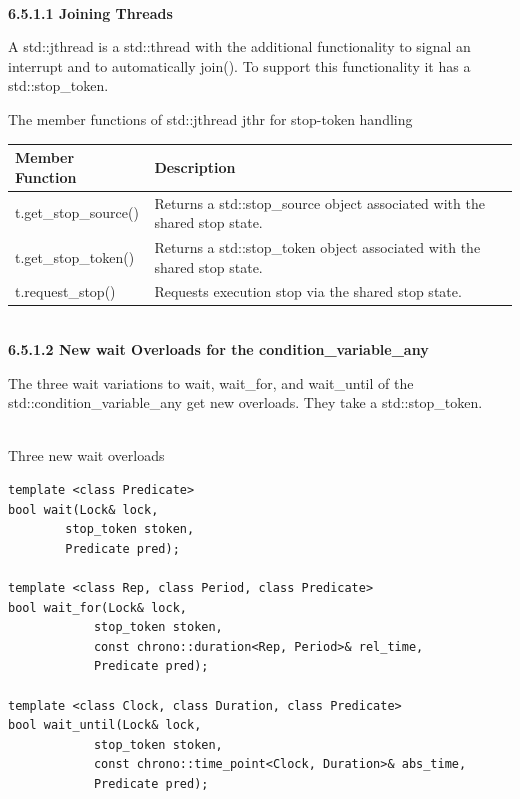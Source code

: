 \hspace*{\fill} \\ %
\noindent
\textbf{6.5.1.1\hspace{0.2cm} Joining Threads}

A std::jthread is a std::thread with the additional functionality to signal an interrupt and to automatically join(). To support this functionality it has a std::stop\_token.

\begin{center}
The member functions of std::jthread jthr for stop-token handling
\end{center}

\begin{table}[H]
\centering
\begin{tabular}{ll}
\textbf{Member Function}   & \textbf{Description}                                        \\ \hline
t.get\_stop\_source() & Returns a std::stop\_source object associated with the shared stop state. \\
t.get\_stop\_token()  & Returns a std::stop\_token object associated with the shared stop state.  \\
t.request\_stop() & Requests execution stop via the shared stop state.
\end{tabular}
\end{table}

\hspace*{\fill} \\ %
\noindent
\textbf{6.5.1.2\hspace{0.2cm} New wait Overloads for the condition\_variable\_any}

The three wait variations to wait, wait\_for, and wait\_until of the std::condition\_variable\_any get new overloads. They take a std::stop\_token.

\hspace*{\fill} \\ %
\noindent
Three new wait overloads
\begin{lstlisting}[style=styleCXX]
template <class Predicate>
bool wait(Lock& lock,
		stop_token stoken,
		Predicate pred);

template <class Rep, class Period, class Predicate>
bool wait_for(Lock& lock,
			stop_token stoken,
			const chrono::duration<Rep, Period>& rel_time,
			Predicate pred);

template <class Clock, class Duration, class Predicate>
bool wait_until(Lock& lock,
			stop_token stoken,
			const chrono::time_point<Clock, Duration>& abs_time,
			Predicate pred);
\end{lstlisting}

